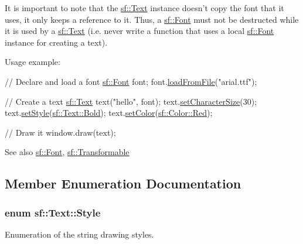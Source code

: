 It is important to note that the \hyperlink{classsf_1_1_text}{sf\+::\+Text} instance doesn't copy the font that it uses, it only keeps a reference to it. Thus, a \hyperlink{classsf_1_1_font}{sf\+::\+Font} must not be destructed while it is used by a \hyperlink{classsf_1_1_text}{sf\+::\+Text} (i.\+e. never write a function that uses a local \hyperlink{classsf_1_1_font}{sf\+::\+Font} instance for creating a text).

Usage example\+: 
\begin{DoxyCode}
\textcolor{comment}{// Declare and load a font}
\hyperlink{classsf_1_1_font}{sf::Font} font;
font.\hyperlink{classsf_1_1_font_ab020052ef4e01f6c749a85571c0f3fd1}{loadFromFile}(\textcolor{stringliteral}{"arial.ttf"});

\textcolor{comment}{// Create a text}
\hyperlink{classsf_1_1_text}{sf::Text} text(\textcolor{stringliteral}{"hello"}, font);
text.\hyperlink{classsf_1_1_text_ae96f835fc1bff858f8a23c5b01eaaf7e}{setCharacterSize}(30);
text.\hyperlink{classsf_1_1_text_ad791702bc2d1b6590a1719aa60635edf}{setStyle}(\hyperlink{classsf_1_1_text_aa8add4aef484c6e6b20faff07452bd82af1b47f98fb1e10509ba930a596987171}{sf::Text::Bold});
text.\hyperlink{classsf_1_1_text_afd1742fca1adb6b0ea98357250ffb634}{setColor}(\hyperlink{classsf_1_1_color_a127dbf55db9c07d0fa8f4bfcbb97594a}{sf::Color::Red});

\textcolor{comment}{// Draw it}
window.draw(text);
\end{DoxyCode}


\begin{DoxySeeAlso}{See also}
\hyperlink{classsf_1_1_font}{sf\+::\+Font}, \hyperlink{classsf_1_1_transformable}{sf\+::\+Transformable} 
\end{DoxySeeAlso}


\subsection{Member Enumeration Documentation}
\hypertarget{classsf_1_1_text_aa8add4aef484c6e6b20faff07452bd82}{
\subsubsection[{Style}]{\setlength{\rightskip}{0pt plus 5cm}enum {\bf sf\+::\+Text\+::\+Style}}}\label{classsf_1_1_text_aa8add4aef484c6e6b20faff07452bd82}


Enumeration of the string drawing styles. 

